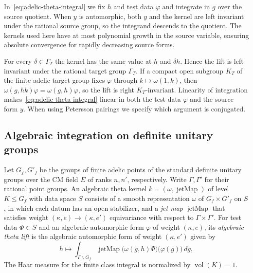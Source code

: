 In~\eqref{eq:adelic-theta-integral} we fix $h$ and test data $\varphi$ and integrate in $g$ over the source quotient. When $y$ is automorphic, both $y$ and the kernel are left invariant under the rational source group, so the integrand descends to the quotient. The kernels used here have at most polynomial growth in the source variable, ensuring absolute convergence for rapidly decreasing source forms.

For every $\delta\in\Gamma_T$ the kernel has the same value at $h$ and $\delta h$. Hence the lift is left invariant under the rational target group $\Gamma_T$. If a compact open subgroup $K_T$ of the finite adelic target group fixes $\varphi$ through $k\mapsto\omega(1,k)$, then $\omega(g,hk)\varphi=\omega(g,h)\varphi$, so the lift is right $K_T$-invariant. Linearity of integration makes~\eqref{eq:adelic-theta-integral} linear in both the test data $\varphi$ and the source form $y$. When using Petersson pairings we specify which argument is conjugated.

\subsection{Algebraic integration on definite unitary groups}

\begin{definition}
\label{def:algebraic-theta-lift}
\emitthmsource
Let $G_f,G'_f$ be the groups of finite adelic points of the standard definite unitary groups over the CM field $E$ of ranks $n,n'$, respectively. Write $\Gamma,\Gamma'$ for their rational point groups.
An algebraic theta kernel $k=(\omega,\operatorname{jetMap})$ of level $K\le G_f$ with data space $S$ consists of a smooth representation $\omega$ of $G_f\times G'_f$ on $S$, in which each datum has an open stabilizer, and a \emph{jet map} $\operatorname{jetMap}$ that satisfies weight $(\kappa,e)\to(\kappa,e')$ equivariance with respect to $\Gamma\times\Gamma'$.
For test data $\Phi\in S$ and an algebraic automorphic form $\varphi$ of weight $(\kappa,e)$, its \emph{algebraic theta lift} is the algebraic automorphic form of weight $(\kappa,e')$ given by
\begin{equation}
 h\longmapsto
 \int_{\Gamma\backslash G_f}
   \operatorname{jetMap}\bigl(\omega(g,h)\Phi\bigr)\bigl(\varphi(g)\bigr)\,dg ,
\label{eq:algebraic-theta-integral}
\end{equation}
The Haar measure for the finite class integral is normalized by $\operatorname{vol}(K)=1$.
\end{definition}

